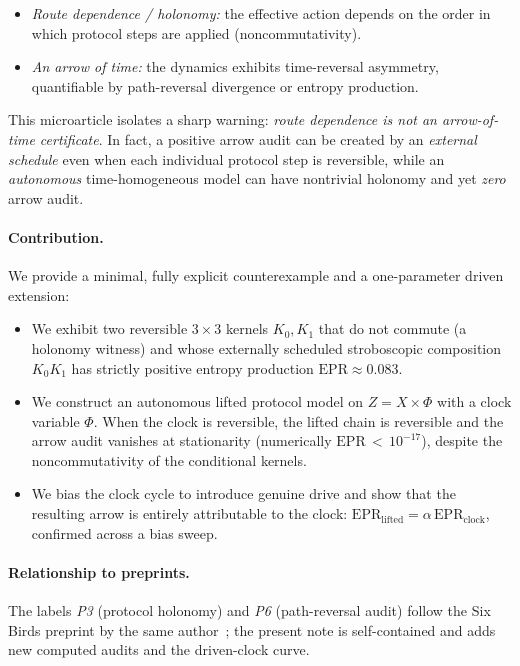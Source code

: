 \documentclass[11pt]{article}
\newcommand{\EprStrobeShort}{\ensuremath{\approx 0.083}}
\newcommand{\EprLiftedUnbiasedShort}{\ensuremath{\,{<}\,10^{-17}}}
\begin{document}
\begin{itemize}
\item \emph{Route dependence / holonomy:} the effective action depends on the order in which protocol steps are applied (noncommutativity).
\item \emph{An arrow of time:} the dynamics exhibits time-reversal asymmetry, quantifiable by path-reversal divergence or entropy production.
\end{itemize}

This microarticle isolates a sharp warning: \emph{route dependence is not an arrow-of-time certificate}. In fact, a positive arrow audit can be created by an \emph{external schedule} even when each individual protocol step is reversible, while an \emph{autonomous} time-homogeneous model can have nontrivial holonomy and yet \emph{zero} arrow audit.

\paragraph{Contribution.}
We provide a minimal, fully explicit counterexample and a one-parameter driven extension:
\begin{itemize}
\item We exhibit two reversible \(3\times 3\) kernels \(K_0,K_1\) that do not commute (a holonomy witness) and whose externally scheduled stroboscopic composition \(K_0K_1\) has strictly positive entropy production \(\mathrm{EPR}\EprStrobeShort\).
\item We construct an autonomous lifted protocol model on \(Z=X\times\Phi\) with a clock variable \(\Phi\). When the clock is reversible, the lifted chain is reversible and the arrow audit vanishes at stationarity (numerically \(\mathrm{EPR}\EprLiftedUnbiasedShort\)), despite the noncommutativity of the conditional kernels.
\item We bias the clock cycle to introduce genuine drive and show that the resulting arrow is entirely attributable to the clock: \(\mathrm{EPR}_{\mathrm{lifted}}=\alpha\,\mathrm{EPR}_{\mathrm{clock}}\), confirmed across a bias sweep.
\end{itemize}

\paragraph{Relationship to preprints.}
The labels \emph{P3} (protocol holonomy) and \emph{P6} (path-reversal audit) follow the Six Birds preprint by the same author~\cite{tsiokos2026sixbirds}; the present note is self-contained and adds new computed audits and the driven-clock curve.
\end{document}
